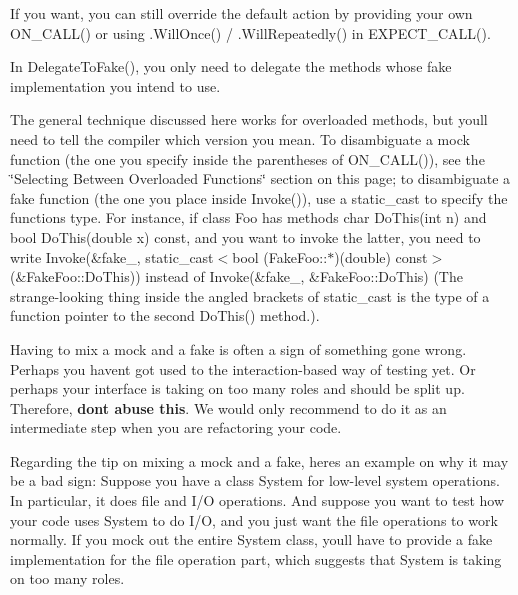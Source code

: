 \begin{DoxyItemize}
\item If you want, you can still override the default action by providing your own {\ttfamily O\+N\+\_\+\+C\+A\+L\+L()} or using {\ttfamily .Will\+Once()} / {\ttfamily .Will\+Repeatedly()} in {\ttfamily E\+X\+P\+E\+C\+T\+\_\+\+C\+A\+L\+L()}.
\item In {\ttfamily Delegate\+To\+Fake()}, you only need to delegate the methods whose fake implementation you intend to use.
\item The general technique discussed here works for overloaded methods, but you\textquotesingle{}ll need to tell the compiler which version you mean. To disambiguate a mock function (the one you specify inside the parentheses of {\ttfamily O\+N\+\_\+\+C\+A\+L\+L()}), see the \char`\"{}\+Selecting Between Overloaded Functions\char`\"{} section on this page; to disambiguate a fake function (the one you place inside {\ttfamily Invoke()}), use a {\ttfamily static\+\_\+cast} to specify the function\textquotesingle{}s type. For instance, if class {\ttfamily Foo} has methods {\ttfamily char Do\+This(int n)} and {\ttfamily bool Do\+This(double x) const}, and you want to invoke the latter, you need to write {\ttfamily Invoke(\&fake\+\_\+, static\+\_\+cast$<$bool (Fake\+Foo\+:\+:$\ast$)(double) const$>$(\&Fake\+Foo\+::\+Do\+This))} instead of {\ttfamily Invoke(\&fake\+\_\+, \&\+Fake\+Foo\+::\+Do\+This)} (The strange-\/looking thing inside the angled brackets of {\ttfamily static\+\_\+cast} is the type of a function pointer to the second {\ttfamily Do\+This()} method.).
\item Having to mix a mock and a fake is often a sign of something gone wrong. Perhaps you haven\textquotesingle{}t got used to the interaction-\/based way of testing yet. Or perhaps your interface is taking on too many roles and should be split up. Therefore, {\bfseries don\textquotesingle{}t abuse this}. We would only recommend to do it as an intermediate step when you are refactoring your code.
\end{DoxyItemize}

Regarding the tip on mixing a mock and a fake, here\textquotesingle{}s an example on why it may be a bad sign\+: Suppose you have a class {\ttfamily System} for low-\/level system operations. In particular, it does file and I/O operations. And suppose you want to test how your code uses {\ttfamily System} to do I/O, and you just want the file operations to work normally. If you mock out the entire {\ttfamily System} class, you\textquotesingle{}ll have to provide a fake implementation for the file operation part, which suggests that {\ttfamily System} is taking on too many roles.

